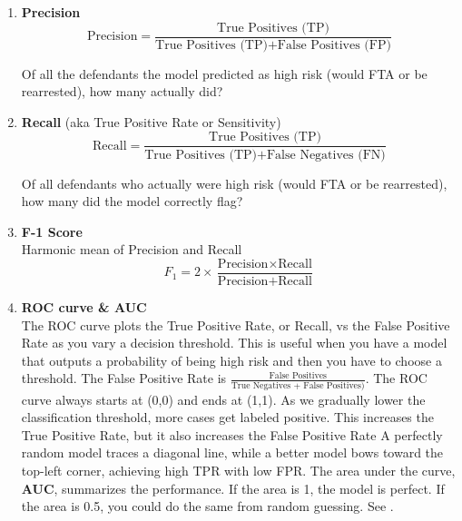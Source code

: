 \begin{enumerate}
\item \textbf{Precision}\\
\begin{equation}
\text{Precision} = \frac{\text{True Positives (TP)}}{\text{True Positives (TP)} + \text{False Positives (FP)}}
\label{eq:precision}
\end{equation}

Of all the defendants the model predicted as high risk (would FTA or be rearrested), how many actually did?

\item \textbf{Recall} (aka True Positive Rate or Sensitivity)\\
\begin{equation}
\text{Recall} = \frac{\text{True Positives (TP)}}{\text{True Positives (TP)} + \text{False Negatives (FN)}}
\label{eq:recall}
\end{equation}

Of all defendants who actually were high risk (would FTA or be rearrested), how many did the model correctly flag?

\item \textbf{F-1 Score}\\
Harmonic mean of Precision and Recall
\begin{equation}
F_1 = 2 \times \frac{\text{Precision} \times \text{Recall}}{\text{Precision} + \text{Recall}}
\label{eq:f1-score}
\end{equation}

\item \textbf{ROC curve \& AUC}\\
The ROC curve plots the True Positive Rate, or Recall, vs the False Positive Rate as you vary a decision threshold. This is useful when you have a model that outputs a probability of being high risk and then you have to choose a threshold. The False Positive Rate is $\frac{\text{False Positives}}{\text{True Negatives + False Positives)}}$. The ROC curve always starts at (0,0) and ends at (1,1). As we gradually lower the classification threshold, more cases get labeled positive. This increases the True Positive Rate, but it also increases the False Positive Rate A perfectly random model traces a diagonal line, while a better model bows toward the top-left corner, achieving high TPR with low FPR. The area under the curve, \textbf{AUC}, summarizes the performance. If the area is 1, the model is perfect. If the area is 0.5, you could do the same from random guessing. See \cite{fawcett2006introduction}.
\end{enumerate}

